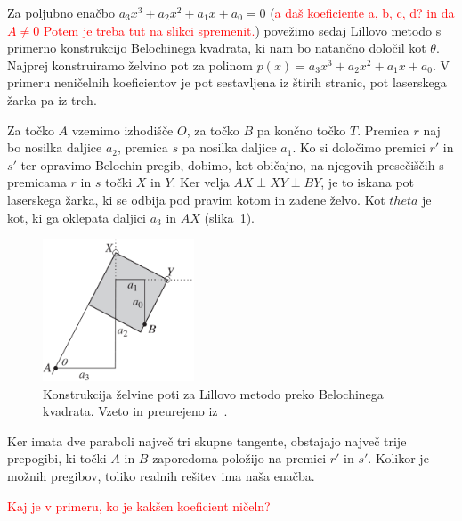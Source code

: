 Za poljubno enačbo $a_3 x^3 + a_2 x^2 + a_1 x + a_0 = 0$ (\textcolor{red}{a daš koeficiente a, b, c, d? in da $A \neq 0$ Potem je treba tut na slikci spremenit.}) povežimo sedaj Lillovo metodo s primerno konstrukcijo Belochinega kvadrata, ki nam bo natančno določil kot $\theta$. Najprej konstruiramo želvino pot za polinom $p(x) = a_3 x^3 + a_2 x^2 + a_1 x + a_0$. V primeru neničelnih koeficientov je pot sestavljena iz štirih stranic, pot laserskega žarka pa iz treh.

Za točko $A$ vzemimo izhodišče $O$, za točko $B$ pa končno točko $T$. Premica $r$ naj bo nosilka daljice $a_2$, premica $s$ pa nosilka daljice $a_1$. Ko si določimo premici $r'$ in $s'$ ter opravimo Belochin pregib, dobimo, kot običajno, na njegovih presečiščih s premicama $r$ in $s$ točki $X$ in $Y$. Ker velja $ AX \perp XY \perp BY $, je to iskana pot laserskega žarka, ki se odbija pod pravim kotom in zadene želvo. Kot $theta$ je kot, ki ga oklepata daljici $a_3$ in $AX$ (slika~\ref{fig:beloch_kubicna_resitev}).

\begin{figure}[h]
    \centering
    \includegraphics[width=0.4\textwidth]{images/kubična enačba/beloch_kubicna_resitev.png}
    \caption[Lillova metoda z Belochinim kvadratom]{Konstrukcija želvine poti za Lillovo metodo preko Belochinega kvadrata. Vzeto in preurejeno iz~\cite[str.\ 313]{hull2011}.}
    \label{fig:beloch_kubicna_resitev}
\end{figure}

Ker imata dve paraboli največ tri skupne tangente, obstajajo največ trije prepogibi, ki točki $A$ in $B$ zaporedoma položijo na premici $r'$ in $s'$. Kolikor je možnih pregibov, toliko realnih rešitev ima naša enačba.


\textcolor{red}{Kaj je v primeru, ko je kakšen koeficient ničeln?}

